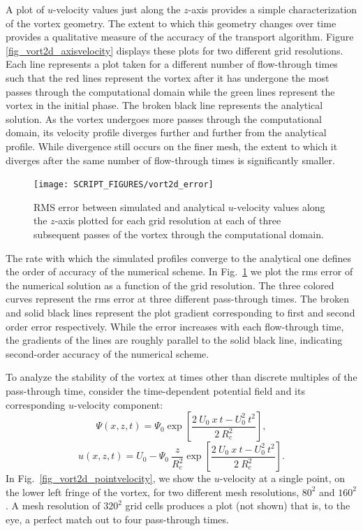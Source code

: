 \documentclass[11pt]{book}
\begin{document}
A plot of $u$-velocity values just along the $z$-axis provides a simple characterization of the vortex geometry. The extent to which this geometry changes over time provides a qualitative measure of the accuracy of the transport algorithm. Figure \ref{fig_vort2d_axisvelocity} displays these plots for two different grid resolutions. Each line represents a plot taken for a different number of flow-through times such that the red lines represent the vortex after it has undergone the most passes through the computational domain while the green lines represent the vortex in the initial phase. The broken black line represents the analytical solution. As the vortex undergoes more passes through the computational domain, its velocity profile diverges further and further from the analytical profile. While divergence still occurs on the finer mesh, the extent to which it diverges after the same number of flow-through times is significantly smaller.

\begin{figure}[h!]
   \centering
    \texttt{[image: SCRIPT\_FIGURES/vort2d\_error]}
    \caption[Convergence study for the  test case]{RMS error between simulated and analytical $u$-velocity values along the $z$-axis plotted for each grid resolution at each of three subsequent passes of the vortex through the computational domain.}
    \label{fig_vort2d_error}
\end{figure}

The rate with which the simulated profiles converge to the analytical one defines the order of accuracy of the numerical scheme. In Fig.~\ref{fig_vort2d_error} we plot the rms error of the numerical solution as a function of the grid resolution. The three colored curves represent the rms error at three different pass-through times. The broken and solid black lines represent the plot gradient corresponding to first and second order error respectively. While the error increases with each flow-through time, the gradients of the lines are roughly parallel to the solid black line, indicating second-order accuracy of the numerical scheme.

To analyze the stability of the vortex at times other than discrete multiples of the pass-through time, consider the time-dependent potential field and its corresponding $u$-velocity component:
\begin{equation}
\label{eqn_vort2d_timedep}
\Psi (x,z,t) = \Psi_{0} \exp \left[\frac{2 \ U_{0} \ x \ t - U_{0}^{2} \ t^{2}}{2 \ R_{c}^{2}} \right],
\end{equation}
\begin{equation}
\label{eqn_uvel_timedep}
u (x,z,t) = U_{0} - \Psi_{0} \ \frac{z}{R_{c}^{2}} \exp \left[\frac{2 \ U_{0} \ x \ t - U_{0}^{2} \ t^{2}}{2 \ R_{c}^{2}} \right].
\end{equation}
In Fig.~\ref{fig_vort2d_pointvelocity}, we show the $u$-velocity at a single point, on the lower left fringe of the vortex, for two different mesh resolutions, $80^{2}$ and $160^{2}$. A mesh resolution of $320^{2}$ grid cells produces a plot (not shown) that is, to the eye, a perfect match out to four pass-through times.
\end{document}
